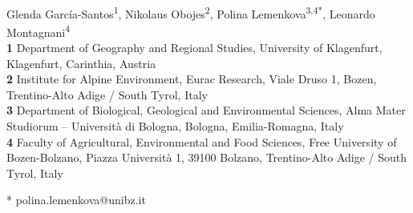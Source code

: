 \documentclass[10pt,letterpaper]{article}
\begin{document}
\vspace*{0.2in}

\begin{flushleft}
{\Large
\textbf{} 
}
\newline
\\
Glenda García-Santos\textsuperscript{1},
Nikolaus Obojes\textsuperscript{2},
Polina Lemenkova\textsuperscript{3,4*},
Leonardo Montagnani\textsuperscript{4}
\\
\bigskip
\textbf{1} Department of Geography and Regional Studies, University of Klagenfurt, Klagenfurt, Carinthia, Austria
\\
\textbf{2} Institute for Alpine Environment, Eurac Research, Viale Druso 1, Bozen, Trentino-Alto Adige / South Tyrol, Italy
\\
\textbf{3} Department of Biological, Geological and Environmental Sciences, Alma Mater Studiorum -- Università di Bologna, Bologna, Emilia-Romagna, Italy
\\
\textbf{4} Faculty of Agricultural, Environmental and Food Sciences, Free University of Bozen-Bolzano, Piazza Università 1, 39100 Bolzano, Trentino-Alto Adige / South Tyrol, Italy
\\
\bigskip

% 
%


* polina.lemenkova@unibz.it

\end{flushleft}

\justifying
\end{document}
